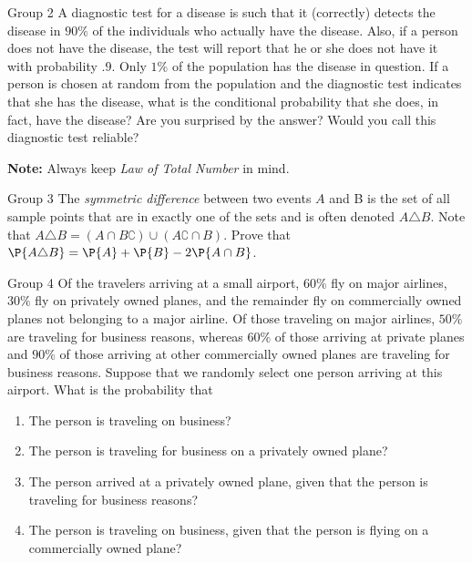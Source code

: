 \documentclass{article}
\theoremstyle{plain}
\theoremstyle{definition}
\theoremstyle{remark}
\begin{document}
\begin{problem}
    {Group 2}
    A diagnostic test for a disease is such that it (correctly) detects the  disease in $90\%$ of the individuals who actually have the disease. Also, if a person does not have the disease, the test will report that he or she does not have it with probability $.9$. Only $1\%$ of the population has the disease in question. If a person is chosen at random from the  population and the diagnostic test indicates that she has the disease, what is the conditional probability that she does, in fact, have the disease? Are you surprised by the answer? Would you call this diagnostic test  reliable?

    \textbf{Note:} Always keep \emph{Law of Total Number} in mind.
\end{problem}

\begin{problem}
    {Group 3}
    The \emph{symmetric difference} between two events $A$ and B is the set of all sample points that are in exactly one of the sets and is often denoted $A\triangle B$. Note that $A\triangle B = ( A \cap B\complement) \cup ( A\complement \cap B)$. Prove that $\P{ A \triangle B} = \P{ A } + \P{ B } - 2\P{ A \cap B }$.
\end{problem}

\begin{problem}
    {Group 4}
    Of the travelers arriving at a small airport, $60\%$ fly on major airlines, $30\%$ fly on privately owned planes, and the remainder fly on commercially owned planes not belonging to a major airline. Of those traveling on major airlines, $50\%$ are traveling for business reasons, whereas $60\%$ of those arriving at private planes and $90\%$ of those arriving at other commercially owned planes are traveling for business reasons. Suppose that we randomly select one person arriving at this airport. What is the probability that
    \begin{enumerate}
        \item The person is traveling on business?
        \item The person is traveling for business on a privately owned plane?
        \item The person arrived at a privately owned plane, given that the person is traveling for business reasons?
        \item The person is traveling on business, given that the person is flying on a commercially owned plane?
    \end{enumerate}
\end{problem}
\end{document}
